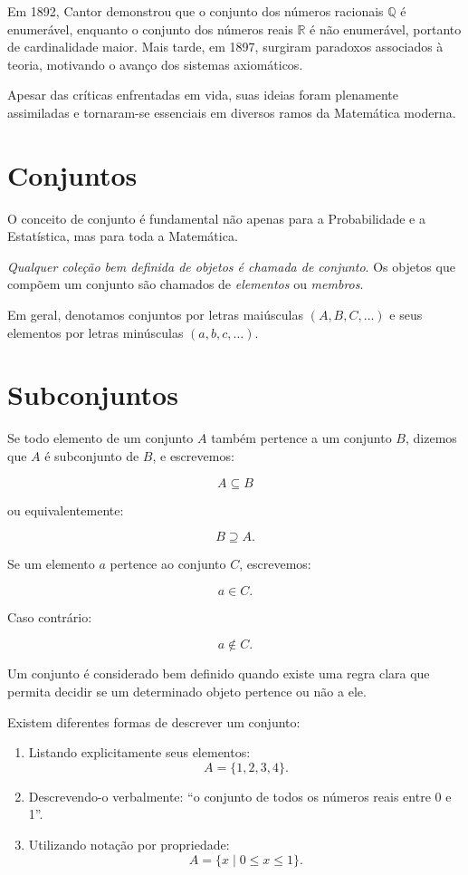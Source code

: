 Em 1892, Cantor demonstrou que o conjunto dos números racionais
$\mathbb{Q}$ é enumerável, enquanto o conjunto dos números reais
$\mathbb{R}$ é não enumerável, portanto de cardinalidade maior.
Mais tarde, em 1897, surgiram paradoxos associados à teoria, motivando o avanço
dos sistemas axiomáticos.
\vskip0.3cm

Apesar das críticas enfrentadas em vida, suas ideias foram plenamente assimiladas
e tornaram-se essenciais em diversos ramos da Matemática moderna.

\section{Conjuntos}

O conceito de conjunto é fundamental não apenas para a Probabilidade e a Estatística,
mas para toda a Matemática. \vskip0.3cm

\textit{Qualquer coleção bem definida de objetos é chamada de conjunto}.
Os objetos que compõem um conjunto são chamados de \textit{elementos} ou
\textit{membros}.
\vskip0.3cm

Em geral, denotamos conjuntos por letras maiúsculas $(A,B,C,\dots)$
e seus elementos por letras minúsculas $(a,b,c,\dots)$.


\newpage
\section{Subconjuntos}

Se todo elemento de um conjunto $A$ também pertence a um conjunto $B$,
dizemos que $A$ é subconjunto de $B$, e escrevemos:

\[
A \subseteq B
\]

ou equivalentemente:

\[
B \supseteq A.
\]

Se um elemento $a$ pertence ao conjunto $C$, escrevemos:

\[
a \in C.
\]

Caso contrário:

\[
a \notin C.
\]

Um conjunto é considerado bem definido quando existe uma regra clara que permita
decidir se um determinado objeto pertence ou não a ele.
\vskip0.3cm

Existem diferentes formas de descrever um conjunto:

\begin{enumerate}
    \item Listando explicitamente seus elementos:
    \[
    A = \{1,2,3,4\}.
    \]

    \item Descrevendo-o verbalmente:
    ``o conjunto de todos os números reais entre 0 e 1''.

    \item Utilizando notação por propriedade:
    \[
    A = \{x \mid 0 \leq x \leq 1\}.
    \]
\end{enumerate}

